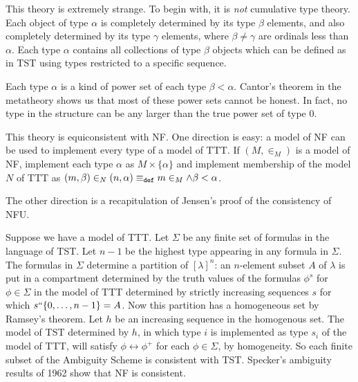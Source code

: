 \documentclass{slides}
\begin{document}
\begin{slide}

This theory is extremely strange.  To begin with, it is {\em not\/} cumulative type theory.  Each object of type $\alpha$ is completely determined by its type $\beta$ elements, and also completely determined by its type $\gamma$ elements, where $\beta \neq \gamma$ are ordinals less than $\alpha$.   Each type $\alpha$ contains all collections of type $\beta$ objects which can be defined as in TST using types restricted to a specific sequence.   

Each type $\alpha$ is a kind of power set of each type $\beta<\alpha$.  Cantor's theorem in the metatheory shows us that most of these power sets cannot be honest.  In fact, no type in the structure can be any larger
than the true power set of type 0.

\end{slide}
\begin{slide}

This theory is equiconsistent with NF.  One direction is easy:  a model of NF can be used to implement every type of a model of TTT.  If $(M,\in_M)$ is a model of NF, implement each type $\alpha$ as
$M \times \{\alpha\}$ and implement membership of the model $N$ of TTT as \newline $(m,\beta) \in_N  (n,\alpha) \equiv_{\tt def} m \in_M \wedge \beta<\alpha$.

The other direction is a recapitulation of Jensen's proof of the consistency of NFU.
\end{slide}

\begin{slide}

Suppose we have a model of TTT.
Let $\Sigma$ be any finite set of formulas in the language of TST.  Let $n-1$ be the highest type appearing in any formula in $\Sigma$.  The formulas in $\Sigma$ determine a partition of $[\lambda]^n$:  an $n$-element subset $A$ of $\lambda$ is put in a compartment determined by the truth values of the formulas $\phi^s$ for $\phi \in \Sigma$ in the model of TTT  determined by strictly increasing sequences $s$ for which $s``\{0,\ldots,n-1\}=A$.  Now this partition has a homogeneous set by Ramsey's theorem.  Let $h$ be an increasing sequence in the homogenous set.  The model of TST determined by $h$, in which type $i$ is implemented as type $s_i$ of the model of TTT,  will satisfy $\phi \leftrightarrow \phi^+$ for each $\phi \in \Sigma$, by homogeneity.  So each finite subset of the Ambiguity Scheme is consistent with TST.  Specker's ambiguity results of 1962 show that NF is consistent.

\end{slide}
\end{document}
